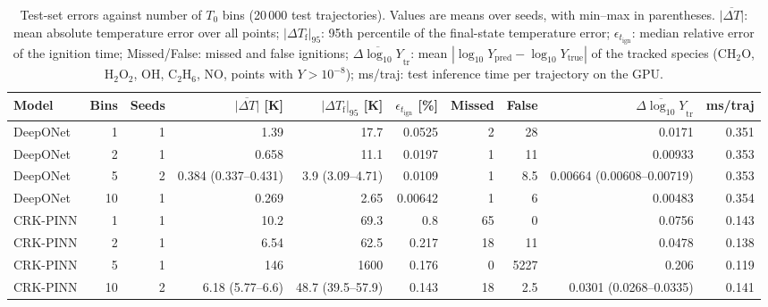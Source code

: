 \begin{table}[htbp]
    \centering
    \small
    \begin{tabular}{lrrrrrrrrr}
        \hline
        Model & Bins & Seeds & $\overline{|\Delta T|}$ [K] & $|\Delta T_\mathrm{f}|_{95}$ [K] & $\epsilon_{t_\mathrm{ign}}$ [\%] & Missed & False & $\overline{\Delta\log_{10}Y}_\mathrm{tr}$ & ms/traj \\
        \hline
        DeepONet & 1 & 1 & 1.39 & 17.7 & 0.0525 & 2 & 28 & 0.0171 & 0.351 \\
        DeepONet & 2 & 1 & 0.658 & 11.1 & 0.0197 & 1 & 11 & 0.00933 & 0.353 \\
        DeepONet & 5 & 2 & 0.384 (0.337--0.431) & 3.9 (3.09--4.71) & 0.0109 & 1 & 8.5 & 0.00664 (0.00608--0.00719) & 0.353 \\
        DeepONet & 10 & 1 & 0.269 & 2.65 & 0.00642 & 1 & 6 & 0.00483 & 0.354 \\
        CRK-PINN & 1 & 1 & 10.2 & 69.3 & 0.8 & 65 & 0 & 0.0756 & 0.143 \\
        CRK-PINN & 2 & 1 & 6.54 & 62.5 & 0.217 & 18 & 11 & 0.0478 & 0.138 \\
        CRK-PINN & 5 & 1 & 146 & 1600 & 0.176 & 0 & 5227 & 0.206 & 0.119 \\
        CRK-PINN & 10 & 2 & 6.18 (5.77--6.6) & 48.7 (39.5--57.9) & 0.143 & 18 & 2.5 & 0.0301 (0.0268--0.0335) & 0.141 \\
        \hline
    \end{tabular}
    \caption{Test-set errors against number of $T_0$ bins (20\,000 test trajectories). Values are means over seeds, with min--max in parentheses. $\overline{|\Delta T|}$: mean absolute temperature error over all points; $|\Delta T_\mathrm{f}|_{95}$: 95th percentile of the final-state temperature error; $\epsilon_{t_\mathrm{ign}}$: median relative error of the ignition time; Missed/False: missed and false ignitions; $\overline{\Delta\log_{10}Y}_\mathrm{tr}$: mean $|\log_{10}Y_\mathrm{pred}-\log_{10}Y_\mathrm{true}|$ of the tracked species ($\mathrm{CH_{2}O}$, $\mathrm{H_{2}O_{2}}$, $\mathrm{OH}$, $\mathrm{C_{2}H_{6}}$, $\mathrm{NO}$, points with $Y>10^{-8}$); ms/traj: test inference time per trajectory on the GPU.}
    \label{tab:bins}
\end{table}
